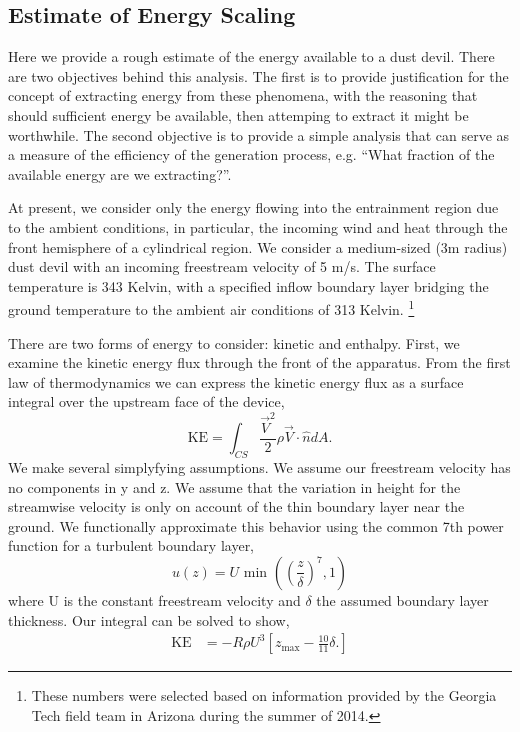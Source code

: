 \subsection{Estimate of Energy Scaling}

Here we provide a rough estimate of the energy
available to a dust devil. There are two objectives behind this
analysis. The first is to provide justification for the concept of
extracting energy from these phenomena, with the reasoning that should
sufficient energy be available, then attemping to extract it might be
worthwhile. The second objective is to provide a simple analysis that
can serve as a measure of the efficiency of the generation process,
e.g. ``What fraction of the available energy are we extracting?''.  

At present, we consider only the energy flowing into the entrainment
region due to the ambient conditions, in particular, the incoming wind
and heat through the front hemisphere of a cylindrical region. We
consider a medium-sized (3m radius) dust devil with an incoming
freestream velocity of 5 m/s. The surface temperature is 343 Kelvin,
with a specified inflow boundary layer bridging the ground temperature
to the ambient air conditions of 313 Kelvin. 
\footnote{\normalsize These numbers were selected based on information
provided by the Georgia Tech field team in Arizona during the summer of
2014.} 

There are two forms of energy to consider: kinetic and enthalpy. First,
we examine the kinetic energy flux through the front of the
apparatus. From the first law of thermodynamics we can express the
kinetic energy flux as a surface integral over the upstream face of the device, 
\begin{equation*}
\text{KE} = \int_{CS} \frac{\vec V^2}{2} \rho \vec V \cdot \hat n dA.
\end{equation*}
%
%
We make several simplyfying assumptions. We assume our freestream
velocity has no components in y and z. 
We assume that the variation in height for the streamwise velocity is only on
account of the thin boundary layer near the ground. We functionally
approximate this behavior using the common 7th power function for a
turbulent boundary layer,  
\begin{equation*}
  u(z) = U \text{ min }\left(\left(\frac{z}{\delta}\right)^7,1\right)
\end{equation*}
where U is the constant freestream velocity and $\delta$ the assumed
boundary layer thickness. Our integral can be solved to show, 
\begin{align*}
\text{KE} & = -R \rho U^3 \left[ z_{\text{max}} - \frac{10}{11}\delta.
\right]
\end{align*}

